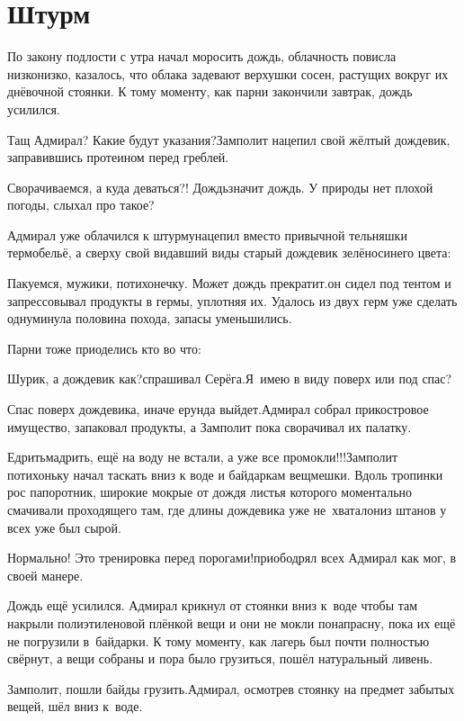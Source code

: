 \chapter{Штурм}
\vepsianrose

По закону подлости с утра начал моросить дождь, облачность повисла низко\sdash низко, казалось, что облака задевают верхушки сосен, растущих вокруг их днёвочной стоянки. К тому моменту, как парни закончили завтрак, дождь усилился.

\diagdash Тащ Адмирал? Какие будут указания?\mdash Замполит нацепил свой жёлтый дождевик, заправившись протеином перед греблей.

\diagdash Сворачиваемся, а куда деваться?! Дождь\mdash значит дождь. У природы нет плохой погоды, слыхал про такое?

Адмирал уже облачился к штурму\mdash нацепил вместо привычной тельняшки термобельё, а сверху свой видавший виды старый дождевик зелёно\sdash синего цвета:

\diagdash Пакуемся, мужики, потихонечку. Может дождь прекратит.\mdash он сидел под тентом и запрессовывал продукты в гермы, уплотняя их. Удалось из двух герм уже сделать одну\mdash минула половина похода, запасы уменьшились.

Парни тоже приоделись кто во что: 

\diagdash Шурик, а дождевик как?\mdash спрашивал Серёга.\mdash Я~имею в виду поверх или под спас?

\diagdash Спас поверх дождевика, иначе ерунда выйдет.\mdash Адмирал собрал прикостровое имущество, запаковал продукты, а Замполит пока сворачивал их палатку.

\diagdash Едрить\sdash мадрить, ещё на воду не встали, а уже все промокли!!!\mdash Замполит потихоньку начал таскать вниз к воде и байдаркам вещмешки. Вдоль тропинки рос папоротник, широкие мокрые от дождя листья которого моментально смачивали проходящего там, где длины дождевика уже не~хватало\mdash низ штанов у всех уже был сырой.

\diagdash Нормально! Это тренировка перед порогами!\mdash приободрял всех Адмирал как мог, в своей манере.

Дождь ещё усилился. Адмирал крикнул от стоянки вниз к~воде чтобы там накрыли полиэтиленовой плёнкой вещи и они не мокли понапрасну, пока их ещё не погрузили в~байдарки. К тому моменту, как лагерь был почти полностью свёрнут, а вещи собраны и пора было грузиться, пошёл натуральный ливень.

\diagdash Замполит, пошли байды грузить.\mdash Адмирал, осмотрев стоянку на предмет забытых вещей, шёл вниз к~воде.

